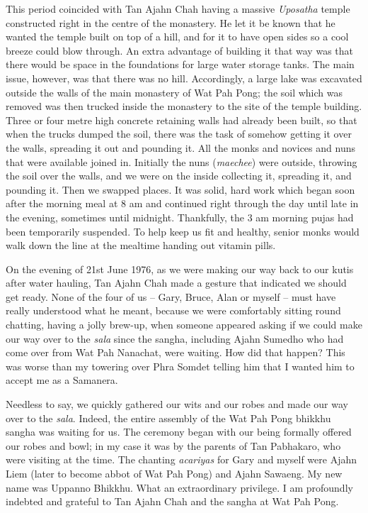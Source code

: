 This period coincided with Tan Ajahn Chah having a massive
\emph{Uposatha} temple constructed right in the centre of the monastery.
He let it be known that he wanted the temple built on top of a hill, and
for it to have open sides so a cool breeze could blow through. An extra
advantage of building it that way was that there would be space in the
foundations for large water storage tanks. The main issue, however, was
that there was no hill. Accordingly, a large lake was excavated outside
the walls of the main monastery of Wat Pah Pong; the soil which was
removed was then trucked inside the monastery to the site of the temple
building. Three or four metre high concrete retaining walls had already
been built, so that when the trucks dumped the soil, there was the task
of somehow getting it over the walls, spreading it out and pounding it.
All the monks and novices and nuns that were available joined in.
Initially the nuns (\emph{maechee}) were outside, throwing the soil over
the walls, and we were on the inside collecting it, spreading it, and
pounding it. Then we swapped places. It was solid, hard work which began
soon after the morning meal at 8 am and continued right through the day
until late in the evening, sometimes until midnight. Thankfully, the 3
am morning pujas had been temporarily suspended. To help keep us fit and
healthy, senior monks would walk down the line at the mealtime handing
out vitamin pills.

On the evening of 21st June 1976, as we were making our way back to our
kutis after water hauling, Tan Ajahn Chah made a gesture that indicated
we should get ready. None of the four of us -- Gary, Bruce, Alan or
myself -- must have really understood what he meant, because we were
comfortably sitting round chatting, having a jolly brew-up, when someone
appeared asking if we could make our way over to the \emph{sala} since
the sangha, including Ajahn Sumedho who had come over from Wat Pah
Nanachat, were waiting. How did that happen? This was worse than my
towering over Phra Somdet telling him that I wanted him to accept me as
a Samanera.

Needless to say, we quickly gathered our wits and our robes and made our
way over to the \emph{sala}. Indeed, the entire assembly of the Wat Pah
Pong bhikkhu sangha was waiting for us. The ceremony began with our being
formally offered our robes and bowl; in my case it was by the parents of
Tan Pabhakaro, who were visiting at the time. The chanting
\emph{acariyas} for Gary and myself were Ajahn Liem (later to become
abbot of Wat Pah Pong) and Ajahn Sawaeng. My new name was Uppanno
Bhikkhu. What an extraordinary privilege. I am profoundly indebted and
grateful to Tan Ajahn Chah and the sangha at Wat Pah Pong.


